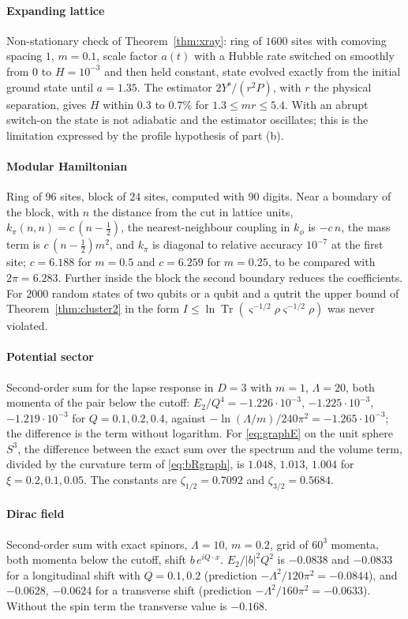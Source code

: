 \documentclass[11pt,a4paper]{article}
\theoremstyle{stmt}
\theoremstyle{defn}
\theoremstyle{rmk}
\numberwithin{equation}{section}
\DeclareMathOperator{\Tr}{Tr}
\begin{document}
\paragraph{Expanding lattice} Non-stationary check of Theorem~\ref{thm:xray}: ring of $1600$ sites with comoving spacing $1$, $m=0.1$, scale factor $a(t)$ with a Hubble rate switched on smoothly from $0$ to $H=10^{-3}$ and then held constant, state evolved exactly from the initial ground state until $a=1.35$. The estimator $2Y^{\mathrm s}/(r^2P)$, with $r$ the physical separation, gives $H$ within $0.3$ to $0.7\%$ for $1.3\le mr\le5.4$. With an abrupt switch-on the state is not adiabatic and the estimator oscillates; this is the limitation expressed by the profile hypothesis of part (b).

\paragraph{Modular Hamiltonian} Ring of $96$ sites, block of $24$ sites, computed with $90$ digits. Near a boundary of the block, with $n$ the distance from the cut in lattice units, $k_\pi(n,n)=c\,(n-\tfrac12)$, the nearest-neighbour coupling in $k_\phi$ is $-c\,n$, the mass term is $c\,(n-\tfrac12)m^2$, and $k_\pi$ is diagonal to relative accuracy $10^{-7}$ at the first site; $c=6.188$ for $m=0.5$ and $c=6.259$ for $m=0.25$, to be compared with $2\pi=6.283$. Further inside the block the second boundary reduces the coefficients. For $2000$ random states of two qubits or a qubit and a qutrit the upper bound of Theorem~\ref{thm:cluster2} in the form $I\le\ln\Tr(\varsigma^{-1/2}\rho\varsigma^{-1/2}\rho)$ was never violated.

\paragraph{Potential sector} Second-order sum for the lapse response in $D=3$ with $m=1$, $\Lambda=20$, both momenta of the pair below the cutoff: $E_2/Q^4=-1.226\cdot10^{-3}$, $-1.225\cdot10^{-3}$, $-1.219\cdot10^{-3}$ for $Q=0.1,0.2,0.4$, against $-\ln(\Lambda/m)/240\pi^2=-1.265\cdot10^{-3}$; the difference is the term without logarithm. For \eqref{eq:graphE} on the unit sphere $S^3$, the difference between the exact sum over the spectrum and the volume term, divided by the curvature term of \eqref{eq:bRgraph}, is $1.048$, $1.013$, $1.004$ for $\xi=0.2,0.1,0.05$. The constants are $\zeta_{1/2}=0.7092$ and $\zeta_{3/2}=0.5684$.

\paragraph{Dirac field} Second-order sum with exact spinors, $\Lambda=10$, $m=0.2$, grid of $60^3$ momenta, both momenta below the cutoff, shift $b\,e^{iQ\cdot x}$. $E_2/|b|^2Q^2$ is $-0.0838$ and $-0.0833$ for a longitudinal shift with $Q=0.1,0.2$ (prediction $-\Lambda^2/120\pi^2=-0.0844$), and $-0.0628$, $-0.0624$ for a transverse shift (prediction $-\Lambda^2/160\pi^2=-0.0633$). Without the spin term the transverse value is $-0.168$.
\end{document}
